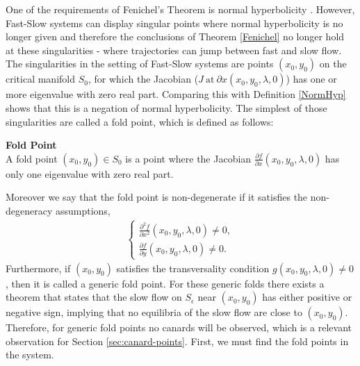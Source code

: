 One of the requirements of Fenichel's Theorem is normal hyperbolicity \citep{Kuehn}. However, Fast-Slow systems can display singular points where normal hyperbolicity is no longer given and therefore the conclusions of Theorem \ref{Fenichel} no longer hold at these singularities - where trajectories can jump between fast and slow flow. The singularities in the setting of Fast-Slow systems are points $(x_0,y_0)$ on the critical manifold $S_0$, for which the Jacobian ($ J \ \text{at} \ {\partial x}(x_0,y_0, \lambda, 0)$) has one or more eigenvalue with zero real part. Comparing this with Definition \ref{NormHyp} shows that this is a negation of normal hyperbolicity. The simplest of those singularities are called a fold point, which is defined as follows:
\begin{definition}{\textbf{Fold Point}} \label{FoldDef} \\
	A fold point $(x_0,y_0) \in S_0$ is a point where the Jacobian $ \frac{\partial f}{\partial x}(x_0,y_0, \lambda, 0)$ has only one eigenvalue with zero real part.
\end{definition}
Moreover we say that the fold point is non-degenerate if it satisfies the non-degeneracy assumptions,
\begin{align} \label{NonDeg}
\begin{cases}
\frac{ \partial ^2 f}{ \partial x^2} (x_0,y_0, \lambda, 0) \neq 0, \\
\frac{\partial f}{\partial y}(x_0,y_0, \lambda, 0) \neq 0.
\end{cases}
\end{align}
Furthermore, if $(x_0,y_0)$ satisfies the transversality condition $g(x_0,y_0, \lambda, 0) \neq 0$, then it is called a generic fold point.
For these generic folds there exists a theorem that states that the slow flow on $S_\epsilon$ near $(x_0,y_0)$ has either positive or negative sign, implying that no equilibria of the slow flow are close to $(x_0,y_0)$. Therefore, for generic fold points no canards will be observed, which is a relevant observation for Section \ref{sec:canard-points}. First, we must find the fold points in the system.\\
